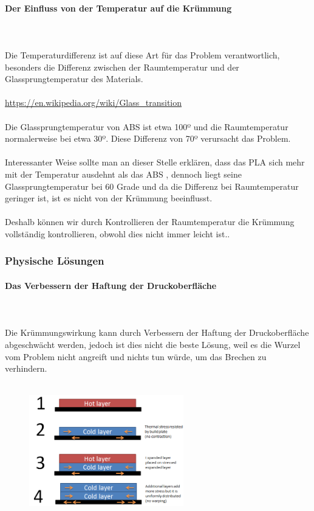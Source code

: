 \documentclass[11pt,a4paper]{article}
\begin{document}
			\paragraph{Der Einfluss von der Temperatur auf die Krümmung}\mbox{}\\\\
Die Temperaturdifferenz ist auf diese Art für das Problem verantwortlich, besonders die Differenz zwischen der Raumtemperatur und der Glassprungtemperatur des Materials.
\\\\
\url{https://en.wikipedia.org/wiki/Glass_transition}
\\\\
Die Glassprungtemperatur von ABS ist etwa 100º und die Raumtemperatur normalerweise bei etwa 30º. Diese Differenz von 70º verursacht das Problem. 
\\\\
Interessanter Weise sollte man an dieser Stelle erklären, dass  das PLA sich mehr mit der Temperatur ausdehnt als das ABS , dennoch liegt seine Glassprungtemperatur bei 60 Grade und da die Differenz bei Raumtemperatur geringer ist, ist es nicht von der Krümmung beeinflusst. 
\\\\
Deshalb können wir durch Kontrollieren der Raumtemperatur die Krümmung vollständig kontrollieren, obwohl dies nicht immer leicht ist..
		\subsubsection{Physische Lösungen}
			\paragraph{Das Verbessern der Haftung der Druckoberfläche}\mbox{}\\\\
Die Krümmungswirkung kann durch Verbessern der Haftung der Druckoberfläche abgeschwächt werden, jedoch ist dies nicht die beste Lösung, weil es die Wurzel vom Problem nicht angreift und nichts tun würde, um das Brechen zu verhindern.
\\\\
\begin{figure}[H]
\centering
\includegraphics[width=0.6\textwidth,cfbox=azul_marcos 4pt 0pt]{FOTOS/CAUSA_WARPING_2}
\end{figure}
\end{document}
